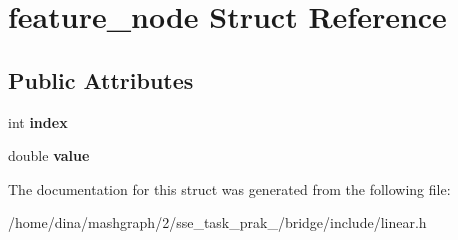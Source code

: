 \hypertarget{structfeature__node}{\section{feature\-\_\-node Struct Reference}
\label{structfeature__node}
}
\subsection*{Public Attributes}
\begin{DoxyCompactItemize}
\item 
\hypertarget{structfeature__node_a62419ddb35b72883a85a6b6cbac258c0}{int {\bfseries index}}\label{structfeature__node_a62419ddb35b72883a85a6b6cbac258c0}

\item 
\hypertarget{structfeature__node_a0f56632dabfd09f2ed609cebfa14f351}{double {\bfseries value}}\label{structfeature__node_a0f56632dabfd09f2ed609cebfa14f351}

\end{DoxyCompactItemize}


The documentation for this struct was generated from the following file\-:\begin{DoxyCompactItemize}
\item 
/home/dina/mashgraph/2/sse\-\_\-task\-\_\-prak\-\_/bridge/include/linear.\-h\end{DoxyCompactItemize}
